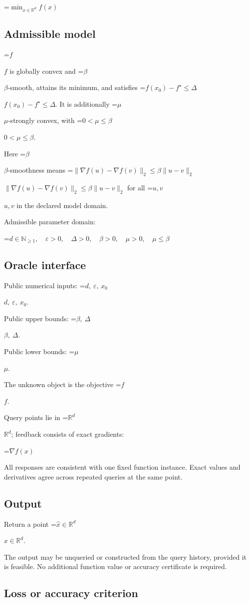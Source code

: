 \documentclass[10pt,a4paper]{article}
\newcommand{\AtlasMath}[1]{\par\begingroup\centering\setbox0=\hbox{$\displaystyle #1$}\ifdim\wd0>1.4\linewidth\typeout{ATLAS WIDE FORMULA: \the\wd0}\fi\ifdim\wd0>\linewidth\resizebox{\linewidth}{!}{\box0}\else\box0\fi\par\endgroup}
\newcommand{\AtlasInlineMath}[1]{\begingroup\setbox0=\hbox{$#1$}\ifdim\wd0>.4\linewidth\endgroup\AtlasMath{#1}\else\endgroup$#1$\fi}
\begin{document}
\AtlasMath{\min_{x\in \mathbb{R}^d}f(x)}


\subsection{Admissible model}
\AtlasInlineMath{f} is globally convex and \AtlasInlineMath{\beta}-smooth, attains its minimum, and satisfies \AtlasInlineMath{f(x_0)-f^\star\le\Delta}. It is additionally \AtlasInlineMath{\mu}-strongly convex, with \AtlasInlineMath{0<\mu\le\beta}.

Here \AtlasInlineMath{\beta}-smoothness means \AtlasInlineMath{\|\nabla f(u)-\nabla f(v)\|_2\le\beta\|u-v\|_2} for all \AtlasInlineMath{u,v} in the declared model domain.

Admissible parameter domain:


\AtlasMath{d\in\mathbb{N}_{\ge1},\quad \varepsilon>0,\quad \Delta>0,\quad \beta>0,\quad \mu>0,\quad \mu\le\beta}


\subsection{Oracle interface}
Public numerical inputs: \AtlasInlineMath{d,\ \varepsilon,\ x_0}.

Public upper bounds: \AtlasInlineMath{\beta,\ \Delta}.

Public lower bounds: \AtlasInlineMath{\mu}.

The unknown object is the objective \AtlasInlineMath{f}.

Query points lie in \AtlasInlineMath{\mathbb{R}^d}; feedback consists of exact gradients:


\AtlasMath{\nabla f(x)}


All responses are consistent with one fixed function instance. Exact values and derivatives agree across repeated queries at the same point.

\subsection{Output}
Return a point \AtlasInlineMath{\widehat x\in\mathbb R^d}.

The output may be unqueried or constructed from the query history, provided it is feasible. No additional function value or accuracy certificate is required.

\subsection{Loss or accuracy criterion}
\end{document}
